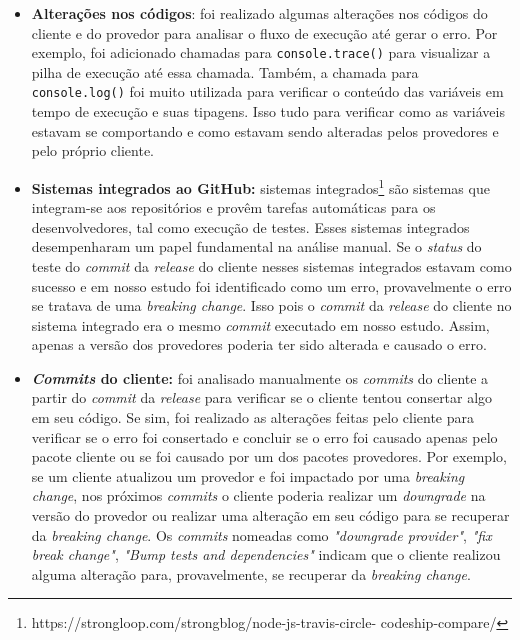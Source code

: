 \begin{itemize}
    \item \textbf{Alterações nos códigos}: foi realizado algumas alterações nos códigos do cliente e do provedor para analisar o fluxo de execução até gerar o erro. Por exemplo, foi adicionado chamadas para \texttt{console.trace()} para visualizar a pilha de execução até essa chamada. Também, a chamada para \texttt{console.log()} foi muito utilizada para verificar o conteúdo das variáveis em tempo de execução e suas tipagens. Isso tudo para verificar como as variáveis estavam se comportando e como estavam sendo alteradas pelos provedores e pelo próprio cliente.

    \item \textbf{Sistemas integrados ao \textsf{GitHub}:} sistemas integrados\footnote{https://strongloop.com/strongblog/node-js-travis-circle-
codeship-compare/} são sistemas que integram-se aos repositórios e provêm tarefas automáticas para os desenvolvedores, tal como execução de testes. Esses sistemas integrados desempenharam um papel fundamental na análise manual. Se o \textit{status} do teste do \textit{commit} da \textit{release} do cliente nesses sistemas integrados estavam como sucesso e em nosso estudo foi identificado como um erro, provavelmente o erro se tratava de uma \textit{breaking change}. Isso pois o \textit{commit} da \textit{release} do cliente no sistema integrado era o mesmo \textit{commit} executado em nosso estudo. Assim, apenas a versão dos provedores poderia ter sido alterada e causado o erro.

    \item \textbf{\textit{Commits} do cliente:} foi analisado manualmente os \textit{commits} do cliente a partir do \textit{commit} da \textit{release} para verificar se o cliente tentou consertar algo em seu código. Se sim, foi realizado as alterações feitas pelo cliente para verificar se o erro foi consertado e concluir se o erro foi causado apenas pelo pacote cliente ou se foi causado por um dos pacotes provedores. Por exemplo, se um cliente atualizou um provedor e foi impactado por uma \textit{breaking change}, nos próximos \textit{commits} o cliente poderia realizar um \textit{downgrade} na versão do provedor ou realizar uma alteração em seu código para se recuperar da \textit{breaking change}. Os \textit{commits} nomeadas como \textit{"downgrade provider"}, \textit{"fix break change"}, \textit{"Bump tests and dependencies"} indicam que o cliente realizou alguma alteração para, provavelmente, se recuperar da \textit{breaking change}.


\end{itemize}
